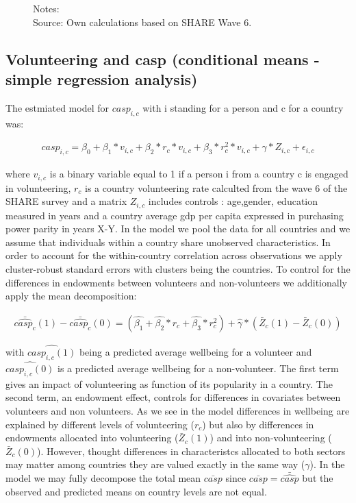 \documentclass[10pt, letterpaper]{article}
\begin{document}
\begin{spacing}{1.4}
\begin{figure}[H]
\begin{minipage}{1\linewidth}
{\footnotesize Notes: }~\\
{\footnotesize Source: Own calculations based on SHARE Wave 6.}
\end{minipage}
\end{figure} 

\subsection*{Volunteering and casp (conditional means - simple regression analysis)}

The estmiated model for $casp_{i,c}$ with i standing for a person and c for a country was:

 \begin{eqnarray}
	casp_{i,c}= \beta_{0}+ \beta_{1}*v_{i,c} + \beta_{2}*r_{c}*v_{i,c}+\beta_{3}*r^{2}_{c}*v_{i,c}+\gamma*Z_{i,c} + \epsilon_{i,c}
 \end{eqnarray}
 
where $v_{i,c}$ is a binary variable equal to 1 if a person i from a country c is engaged in  volunteering, $r_{c}$ is a country volunteering rate calculted from the wave 6 of the SHARE survey and a matrix $Z_{i,c}$ includes controls : age,gender, education measured in years and a country average gdp per capita expressed in purchasing power parity in years X-Y. In the model we pool the data for all countries and we assume that individuals within a country share unobserved characteristics. In order to account for the within-country correlation across observations we apply cluster-robust  standard errors with clusters being the countries. To control for the differences in endowments between volunteers and non-volunteers we additionally apply the mean decomposition:

 \begin{eqnarray}
	\bar{\hat{casp_{c}}}(1)-\bar{\hat{casp_{c}}}(0)= (\hat{\beta_{1}}+\hat{\beta_{2}}*r_{c}+\hat{\beta_{3}}*r^{2}_{c})+\hat{\gamma}*(\bar{Z}_{c}(1)-\bar{Z}_{c}(0))
 \end{eqnarray}
       
with $\hat{casp_{i,c}(1)}$ being a predicted average wellbeing for a volunteer and $\hat{casp_{i,c}(0)}$ is a predicted average wellbeing for a non-volunteer.  The first term gives an impact of volunteering as function of its popularity in a country. The second term, an endowment effect, controls for differences in covariates between volunteers and non volunteers. As we see in the model differences in wellbeing are explained by different levels of volunteering ($ r_{c}$) but also by differences in endowments allocated into volunteering ($\bar{Z}_{c}(1)$) and into non-volunteering ($\bar{Z}_{c}(0)$). However, thought differences in characteristcs allocated to both sectors may matter among countries they are valued exactly in the same way ($\gamma$). In the model we may fully decompose the total mean $\bar{casp}$ since $\bar{casp} = \bar{\hat{casp}}$ but the observed and predicted means on country levels are not equal. \\ 


\end{spacing}
\end{document}
